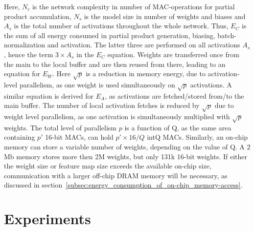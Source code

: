 \documentclass[article,10pt]{IEEEtran}
\begin{document}
Here, $N_{c}$ is the network complexity in number of MAC-operations for partial product accumulation, $N_{s}$ is the model size in number of weights and biases and $A_{s}$ is the total number of activations throughout the whole network. Thus, $E_C$ is the sum of all energy consumed in partial product generation, biasing, batch-normalization and activation. The latter three are performed on all activations $A_s$, hence the term $3\times A_s$ in the $E_C$ equation. Weights are transferred once from the main to the local buffer and are then reused from there, leading to an equation for $E_W$. Here $\sqrt p$ is a reduction in memory energy, due to activation-level parallelism, as one weight is used simultaneously on $\sqrt p$ activations. A similar equation is derived for $E_A$, as activations are fetched/stored from/to the main buffer. The number of local activation fetches is reduced by $\sqrt p$ due to weight level parallelism, as one activation is simultaneously multiplied with $\sqrt p$ weights. The total level of parallelism $p$ is a function of Q, as the same area containing $p'$ 16-bit MACs, can hold $p'\times 16/Q$ intQ MACs. Similarly, an on-chip memory can store a variable number of weights, depending on the value of Q. A $2$Mb memory stores more then 2M weights, but only 131k 16-bit weights. If either the weight size or feature map size exceeds the available on-chip size, communication with a larger off-chip DRAM memory will be necessary, as discussed in section~\ref{subsec:energy_consumption_of_on-chip_memory-access}.


\section{Experiments}
\label{sec:experiments}
\end{document}
